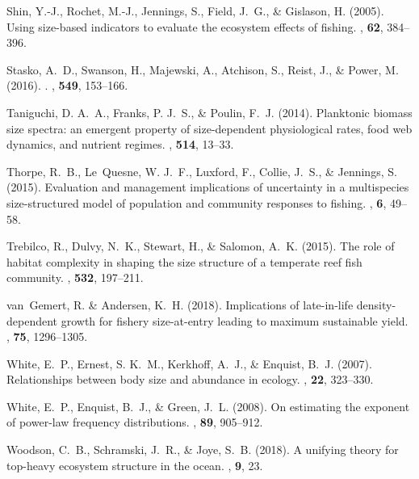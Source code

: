 \documentclass[12pt, letter]{article}
\begin{document}
\begin{thebibliography}{}
Shin, Y.-J., Rochet, M.-J., Jennings, S., Field, J.~G., \& Gislason, H.
  (2005).
\newblock Using size-based indicators to evaluate the ecosystem effects of
  fishing.
, {\bf 62}, 384--396.

Stasko, A.~D., Swanson, H., Majewski, A., Atchison, S., Reist, J., \& Power,
  M. (2016).
.
, {\bf 549}, 153--166.

Taniguchi, D. A.~A., Franks, P. J.~S., \& Poulin, F.~J. (2014).
\newblock Planktonic biomass size spectra: an emergent property of
  size-dependent physiological rates, food web dynamics, and nutrient regimes.
, {\bf 514}, 13--33.

Thorpe, R.~B., {Le~Quesne}, W. J.~F., Luxford, F., Collie, J.~S., \& Jennings,
  S. (2015).
\newblock Evaluation and management implications of uncertainty in a
  multispecies size-structured model of population and community responses to
  fishing.
, {\bf 6}, 49--58.

Trebilco, R., Dulvy, N.~K., Stewart, H., \& Salomon, A.~K. (2015).
\newblock The role of habitat complexity in shaping the size structure of a
  temperate reef fish community.
, {\bf 532}, 197--211.

{van~Gemert}, R. \& Andersen, K.~H. ({2018}).
\newblock Implications of late-in-life density-dependent growth for fishery
  size-at-entry leading to maximum sustainable yield.
, {\bf 75}, 1296--1305.

White, E.~P., Ernest, S. K.~M., Kerkhoff, A.~J., \& Enquist, B.~J. (2007).
\newblock Relationships between body size and abundance in ecology.
, {\bf 22}, 323--330.

White, E.~P., Enquist, B.~J., \& Green, J.~L. (2008).
\newblock On estimating the exponent of power-law frequency distributions.
, {\bf 89}, 905--912.

Woodson, C.~B., Schramski, J.~R., \& Joye, S.~B. (2018).
\newblock A unifying theory for top-heavy ecosystem structure in the ocean.
, {\bf 9}, 23.


\end{thebibliography}
\end{document}
